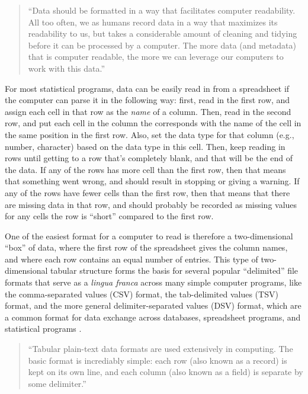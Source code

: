 \documentclass[]{tufte-book}
\begin{document}
\begin{quote}
``Data should be formatted in a way that facilitates computer readability. All
too often, we as humans record data in a way that maximizes its readability to
us, but takes a considerable amount of cleaning and tidying before it can be
processed by a computer. The more data (and metadata) that is computer readable,
the more we can leverage our computers to work with this data.''
\citep{buffalo2015bioinformatics}
\end{quote}

For most statistical programs, data can be easily read in from a spreadsheet if
the computer can parse it in the following way: first, read in the first row,
and assign each cell in that row as the \emph{name} of a column. Then, read in the
second row, and put each cell in the column the corresponds with the name of the
cell in the same position in the first row. Also, set the data type for that
column (e.g., number, character) based on the data type in this cell. Then, keep
reading in rows until getting to a row that's completely blank, and that will be
the end of the data. If any of the rows has more cell than the first row, then
that means that something went wrong, and should result in stopping or giving a
warning. If any of the rows have fewer cells than the first row, then that means
that there are missing data in that row, and should probably be recorded as
missing values for any cells the row is ``short'' compared to the first row.

One of the easiest format for a computer to read is therefore a two-dimensional
``box'' of data, where the first row of the spreadsheet gives the column names,
and where each row contains an equal number of entries. This type of
two-dimensional tabular structure forms the basis for several popular
``delimited'' file formats that serve as a \emph{lingua franca} across many simple
computer programs, like the comma-separated values (CSV) format, the
tab-delimited values (TSV) format, and the more general delimiter-separated
values (DSV) format, which are a common format for data exchange across
databases, spreadsheet programs, and statistical programs \citep{janssens2014data, raymond2003art, buffalo2015bioinformatics}.

\begin{quote}
``Tabular plain-text data formats are used extensively in computing. The basic
format is incrediably simple: each row (also known as a record) is kept on its
own line, and each column (also known as a field) is separate by some delimiter.''
\citep{buffalo2015bioinformatics}
\end{quote}
\end{document}
